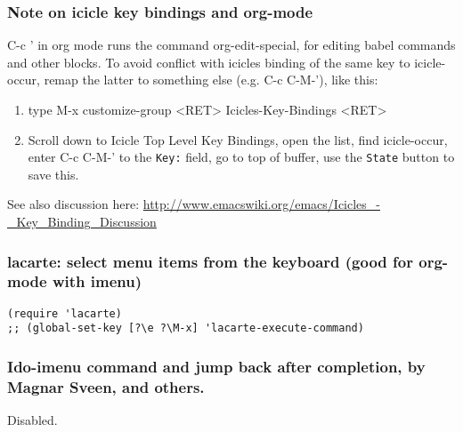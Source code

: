 \documentclass{article}
\begin{document}
\subsubsection{Note on icicle key bindings and org-mode}
\label{sec-1-11-10}

C-c ' in org mode runs the command org-edit-special, for editing babel commands and other blocks.  To avoid conflict with icicles binding of the same key to icicle-occur, remap the latter to something else (e.g. C-c C-M-'), like this:
\begin{enumerate}
\item type M-x customize-group <RET> Icicles-Key-Bindings <RET>
\item Scroll down to Icicle Top Level Key Bindings, open the list, find icicle-occur, enter C-c C-M-' to the \texttt{Key:} field, go to top of buffer, use the \texttt{State} button to save this.
\end{enumerate}

See also discussion here: \url{http://www.emacswiki.org/emacs/Icicles_-_Key_Binding_Discussion}

\subsubsection{lacarte: select menu items from the keyboard (good for org-mode with imenu)}
\label{sec-1-11-11}

\begin{verbatim}
(require 'lacarte)
;; (global-set-key [?\e ?\M-x] 'lacarte-execute-command)
\end{verbatim}

\subsubsection{Ido-imenu command and jump back after completion, by Magnar Sveen, and others.}
\label{sec-1-11-12}

Disabled.
\end{document}
